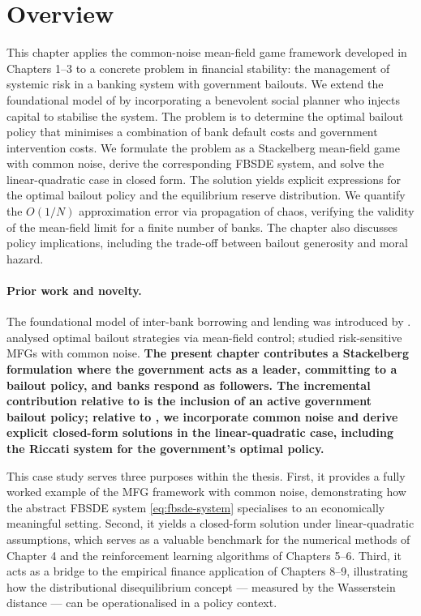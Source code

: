 
\section{Overview}

This chapter applies the common-noise mean-field game framework developed in
Chapters 1--3 to a concrete problem in financial stability: the management of
systemic risk in a banking system with government bailouts. We extend the
foundational model of \citep{carmonafouquesun2015} by incorporating a benevolent
social planner who injects capital to stabilise the system. The problem is to
determine the optimal bailout policy that minimises a combination of bank default
costs and government intervention costs. We formulate the problem as a Stackelberg
mean-field game with common noise, derive the corresponding FBSDE system, and solve
the linear-quadratic case in closed form. The solution yields explicit expressions
for the optimal bailout policy and the equilibrium reserve distribution. We quantify
the $O(1/N)$ approximation error via propagation of chaos, verifying the validity of
the mean-field limit for a finite number of banks. The chapter also discusses policy
implications, including the trade-off between bailout generosity and moral hazard.

\paragraph{Prior work and novelty.} The foundational model of inter-bank borrowing
and lending was introduced by \citep{carmonafouquesun2015}. \citep{cuchieroreisingerrigger2024} analysed optimal bailout strategies via mean-field control; \citep{renfiroozi2024} studied risk-sensitive MFGs with common noise. \textbf{The present
chapter contributes a Stackelberg formulation where the government acts as a leader,
committing to a bailout policy, and banks respond as followers. The incremental
contribution relative to \citep{carmonafouquesun2015} is the inclusion of an
active government bailout policy; relative to \citep{cuchieroreisingerrigger2024},
we incorporate common noise and derive explicit closed-form solutions in the
linear-quadratic case, including the Riccati system for the government's optimal
policy.}

This case study serves three purposes within the thesis. First, it provides a fully
worked example of the MFG framework with common noise, demonstrating how the
abstract FBSDE system \eqref{eq:fbsde-system} specialises to an economically
meaningful setting. Second, it yields a closed-form solution under linear-quadratic
assumptions, which serves as a valuable benchmark for the numerical methods of
Chapter 4 and the reinforcement learning algorithms of Chapters 5--6. Third, it acts
as a bridge to the empirical finance application of Chapters 8--9, illustrating how
the distributional disequilibrium concept --- measured by the Wasserstein distance ---
can be operationalised in a policy context.

